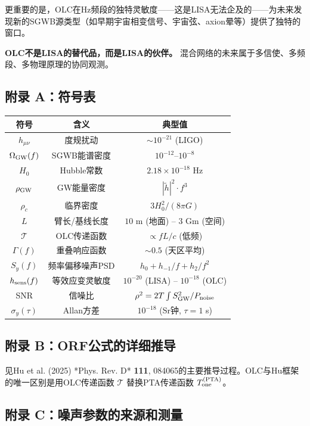 \documentclass[12pt,a4paper]{article}
\begin{document}
更重要的是，OLC在Hz频段的独特灵敏度——这是LISA无法企及的——为未来发现新的SGWB源类型（如早期宇宙相变信号、宇宙弦、axion晕等）提供了独特的窗口。

\textbf{OLC不是LISA的替代品，而是LISA的伙伴。} 混合网络的未来属于多信使、多频段、多物理原理的协同观测。


\subsection{附录 A：符号表}


\begin{tabular}{|c|c|c|}
\hline
符号 & 含义 & 典型值 \\
\hline
$h_{\mu\nu}$ & 度规扰动 & $\sim 10^{-21}$ (LIGO) \\
$\Omega_{\rm GW}(f)$ & SGWB能谱密度 & $10^{-12}$–$10^{-8}$ \\
$H_0$ & Hubble常数 & $2.18 \times 10^{-18}$ Hz \\
$\rho_{\rm GW}$ & GW能量密度 & $|\tilde{h}|^2 \cdot f^3$ \\
$\rho_c$ & 临界密度 & $3H_0^2/(8\pi G)$ \\
$L$ & 臂长/基线长度 & $10$ m (地面) – $3$ Gm (空间) \\
$\mathcal{T}$ & OLC传递函数 & $\propto fL/c$ (低频) \\
$\Gamma(f)$ & 重叠响应函数 & $\sim 0.5$ (天区平均) \\
$S_y(f)$ & 频率偏移噪声PSD & $h_0 + h_{-1}/f + h_2/f^2$ \\
$h_{\rm sens}(f)$ & 等效应变灵敏度 & $10^{-20}$ (LISA) – $10^{-18}$ (OLC) \\
SNR & 信噪比 & $\rho^2 = 2T \int S_{\rm GW}^2/P_{\rm noise}$ \\
$\sigma_y(\tau)$ & Allan方差 & $10^{-18}$ (Sr钟, $\tau=1$ s) \\
\hline
\end{tabular}


\subsection{附录 B：ORF公式的详细推导}


见Hu et al. (2025) *Phys. Rev. D* \textbf{111}, 084065的主要推导过程。OLC与Hu框架的唯一区别是用OLC传递函数 $\mathcal{T}$ 替换PTA传递函数 $T_{\rm one}^{\rm (PTA)}$。

\subsection{附录 C：噪声参数的来源和测量}
\end{document}
